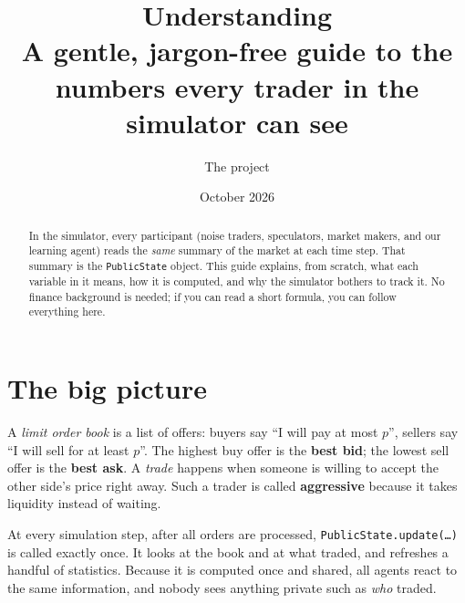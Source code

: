\documentclass[11pt,a4paper]{article}
\title{\textbf{\Huge Understanding \code{PublicState}}\\[8pt]
       \large A gentle, jargon-free guide to the numbers every trader in the simulator can see}
\author{The \code{order\_book} project}
\date{October 2026}
\newcommand{\code}[1]{\texttt{#1}}
\begin{document}
\maketitle
\thispagestyle{fancy}

\begin{abstract}
\noindent
In the simulator, every participant (noise traders, speculators, market makers, and our
learning agent) reads the \emph{same} summary of the market at each time step. That summary is
the \code{PublicState} object. This guide explains, from scratch, what each variable in it means, how
it is computed, and why the simulator bothers to track it. No finance background is needed; if you
can read a short formula, you can follow everything here.
\end{abstract}

\tableofcontents
\bigskip

\section{The big picture}

A \emph{limit order book} is a list of offers: buyers say ``I will pay at most $p$'', sellers say
``I will sell for at least $p$''. The highest buy offer is the \textbf{best bid}; the lowest sell
offer is the \textbf{best ask}. A \emph{trade} happens when someone is willing to accept the other
side's price right away. Such a trader is called \textbf{aggressive} because it takes liquidity
instead of waiting.

At every simulation step, after all orders are processed, \code{PublicState.update(\dots)} is called
exactly once. It looks at the book and at what traded, and refreshes a handful of statistics. Because
it is computed once and shared, all agents react to the same information, and nobody sees anything
private such as \emph{who} traded.

\begin{center}
\end{center}
\end{document}
